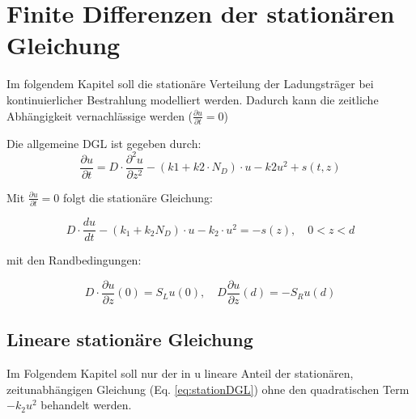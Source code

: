 \chapter{Finite Differenzen der stationären Gleichung}
Im folgendem Kapitel soll die stationäre Verteilung der Ladungsträger bei kontinuierlicher Bestrahlung modelliert werden. 
Dadurch kann die zeitliche Abhängigkeit vernachlässige werden ($\frac{\partial u}{\partial t}=0$)
 
Die allgemeine DGL ist gegeben durch:
\begin{equation}
	\frac{\partial u}{\partial t}= D\cdot\frac{\partial ^2 u }{\partial z^2}-(k1+k2\cdot N_D)\cdot u -k2u^2 +s(t,z)
\end{equation}

Mit $\frac{\partial u}{\partial t}=0$ folgt die stationäre Gleichung:

\begin{equation}\label{eq:stationDGL}
	D\cdot \frac{du}{dt} -\left( k_1 +k_2 N_D\right)\cdot u-k_2\cdot u^2=-s(z), \quad 0 <z<d
\end{equation}

mit den Randbedingungen:

\begin{equation}
	D\cdot \frac{\partial u}{\partial z}(0)=S_Lu(0),\quad D\frac{\partial u}{\partial z}(d)=-S_Ru(d)
\end{equation}
\section{Lineare stationäre Gleichung}
Im Folgendem Kapitel soll nur der in u lineare Anteil der stationären, zeitunabhängigen Gleichung (Eq. \ref{eq:stationDGL}) ohne den quadratischen Term $-k_2u^2$ behandelt werden\cite{Prof.Dr.AndreasZeiser.April2021}.

